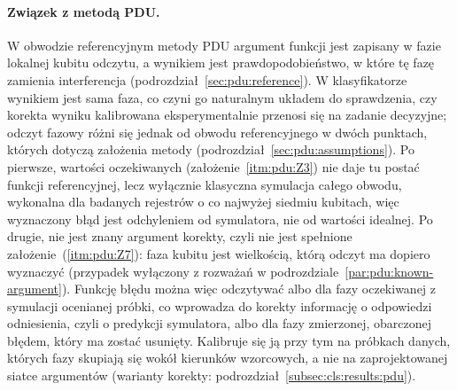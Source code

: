\paragraph{Związek z metodą PDU.}
W obwodzie referencyjnym metody PDU argument funkcji jest zapisany w fazie lokalnej kubitu odczytu, a wynikiem jest prawdopodobieństwo, w które tę fazę zamienia interferencja (podrozdział~\ref{sec:pdu:reference}).
W klasyfikatorze wynikiem jest sama faza, co czyni go naturalnym układem do sprawdzenia, czy korekta wyniku kalibrowana eksperymentalnie przenosi się na zadanie decyzyjne; odczyt fazowy różni się jednak od obwodu referencyjnego w dwóch punktach, których dotyczą założenia metody (podrozdział~\ref{sec:pdu:assumptions}).
Po pierwsze, wartości oczekiwanych (założenie~\ref{itm:pdu:Z3}) nie daje tu postać funkcji referencyjnej, lecz wyłącznie klasyczna symulacja całego obwodu, wykonalna dla badanych rejestrów o co najwyżej siedmiu kubitach, więc wyznaczony błąd jest odchyleniem od symulatora, nie od wartości idealnej.
Po drugie, nie jest znany argument korekty, czyli nie jest spełnione założenie~(\ref{itm:pdu:Z7}): faza kubitu jest wielkością, którą odczyt ma dopiero wyznaczyć (przypadek wyłączony z rozważań w podrozdziale~\ref{par:pdu:known-argument}).
Funkcję błędu można więc odczytywać albo dla fazy oczekiwanej z symulacji ocenianej próbki, co wprowadza do korekty informację o odpowiedzi odniesienia, czyli o predykcji symulatora, albo dla fazy zmierzonej, obarczonej błędem, który ma zostać usunięty.
Kalibruje się ją przy tym na próbkach danych, których fazy skupiają się wokół kierunków wzorcowych, a nie na zaprojektowanej siatce argumentów (warianty korekty: podrozdział~\ref{subsec:cls:results:pdu}).

